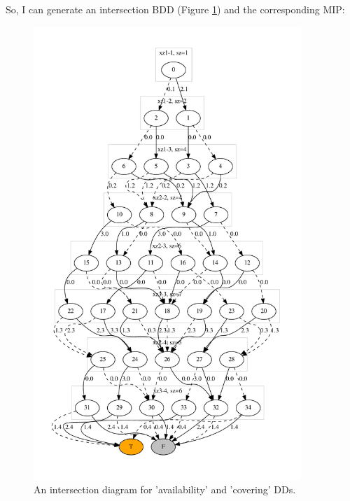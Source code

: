 \documentclass[11pt]{article}
\begin{document}
So, I can generate an intersection BDD (Figure \ref{fig:intDD}) and the corresponding MIP:

\begin{figure}[h!]
\includegraphics[width=0.9\textwidth]{./intersection.dot.pdf}
\caption{An intersection diagram for 'availability' and 'covering' DDs.}
\label{fig:intDD}
\end{figure}
\end{document}
